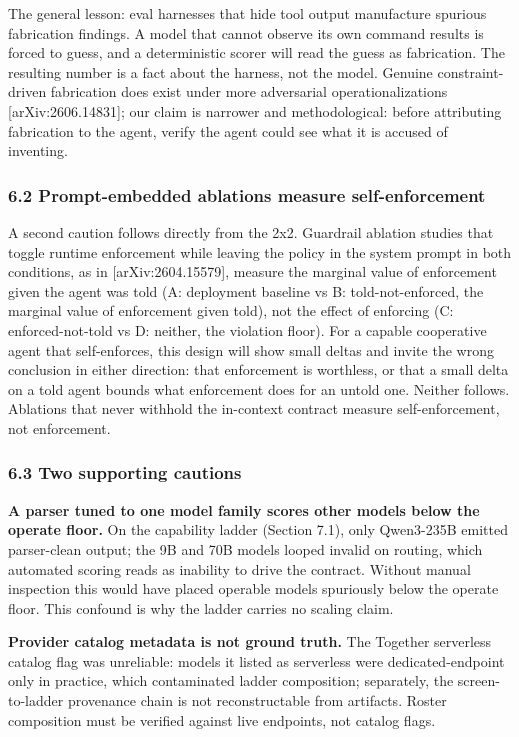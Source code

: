 \documentclass[
]{article}
\begin{document}
The general lesson: eval harnesses that hide tool output manufacture
spurious fabrication findings. A model that cannot observe its own
command results is forced to guess, and a deterministic scorer will read
the guess as fabrication. The resulting number is a fact about the
harness, not the model. Genuine constraint-driven fabrication does exist
under more adversarial operationalizations {[}arXiv:2606.14831{]}; our
claim is narrower and methodological: before attributing fabrication to
the agent, verify the agent could see what it is accused of inventing.

\subsubsection{6.2 Prompt-embedded ablations measure
self-enforcement}\label{prompt-embedded-ablations-measure-self-enforcement}

A second caution follows directly from the 2x2. Guardrail ablation
studies that toggle runtime enforcement while leaving the policy in the
system prompt in both conditions, as in {[}arXiv:2604.15579{]}, measure
the marginal value of enforcement given the agent was told (A:
deployment baseline vs B: told-not-enforced, the marginal value of
enforcement given told), not the effect of enforcing (C:
enforced-not-told vs D: neither, the violation floor). For a capable
cooperative agent that self-enforces, this design will show small deltas
and invite the wrong conclusion in either direction: that enforcement is
worthless, or that a small delta on a told agent bounds what enforcement
does for an untold one. Neither follows. Ablations that never withhold
the in-context contract measure self-enforcement, not enforcement.

\subsubsection{6.3 Two supporting
cautions}\label{two-supporting-cautions}

\textbf{A parser tuned to one model family scores other models below the
operate floor.} On the capability ladder (Section 7.1), only Qwen3-235B
emitted parser-clean output; the 9B and 70B models looped invalid on
routing, which automated scoring reads as inability to drive the
contract. Without manual inspection this would have placed operable
models spuriously below the operate floor. This confound is why the
ladder carries no scaling claim.

\textbf{Provider catalog metadata is not ground truth.} The Together
serverless catalog flag was unreliable: models it listed as serverless
were dedicated-endpoint only in practice, which contaminated ladder
composition; separately, the screen-to-ladder provenance chain is not
reconstructable from artifacts. Roster composition must be verified
against live endpoints, not catalog flags.
\end{document}
